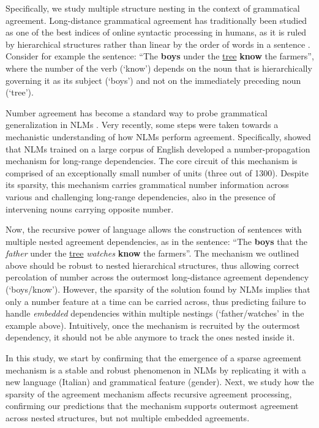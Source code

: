 Specifically, we study multiple structure nesting in the context of grammatical agreement. Long-distance grammatical agreement has traditionally been studied as one of the  best indices of online syntactic processing in humans, as it is ruled
by hierarchical structures rather than linear by the order of words in
a sentence \citep{Bock:Miller:1991, franck2002subject}. Consider for example the sentence: ``The \textbf{boys} under the \underline{tree} \textbf{know} the farmers'', where the number of the verb (`know') depends on the noun that is hierarchically governing it as its subject (`boys') and not on the immediately preceding noun (`tree').

Number agreement has become a standard way to probe grammatical
generalization in NLMs \citep{Linzen:etal:2016,Bernardy:Lappin:2017,Giulianelli:etal:2018,Gulordava:etal:2018}. Very
recently, some steps were taken towards a mechanistic understanding of
how NLMs perform agreement. Specifically, \citet{lakretz2019emergence} showed that NLMs trained
on a large corpus of English developed a number-propagation mechanism for long-range dependencies. The core circuit of this mechanism is comprised of an exceptionally small number of units (three out of 1300). Despite its sparsity, this mechanism carries grammatical number information across various and challenging long-range dependencies, also in the presence of intervening nouns carrying opposite number.

Now, the recursive power of language allows the construction of sentences with multiple nested agreement dependencies, as in the sentence: ``The \textbf{boys} that the \textit{father} under the \underline{tree} \textit{watches} \textbf{know} the farmers''. The mechanism we outlined above should be robust to nested hierarchical structures, thus allowing correct percolation of number across the outermost long-distance agreement dependency (`boys/know'). However, the sparsity of the solution found by NLMs implies that only a number feature at a time can be carried across, thus predicting failure to handle \emph{embedded} dependencies within multiple nestings (`father/watches' in the example above). Intuitively, once the mechanism is recruited by the outermost
dependency, it should not be able anymore to track the ones nested inside it.

In this study, we start by confirming that the emergence of a sparse
agreement mechanism is a stable and robust phenomenon in NLMs by
replicating it with a new language (Italian) and grammatical feature
(gender). Next, we study how the sparsity of the agreement mechanism
affects recursive agreement processing, confirming our predictions
that the mechanism supports outermost agreement across nested
structures, but not multiple embedded agreements.

